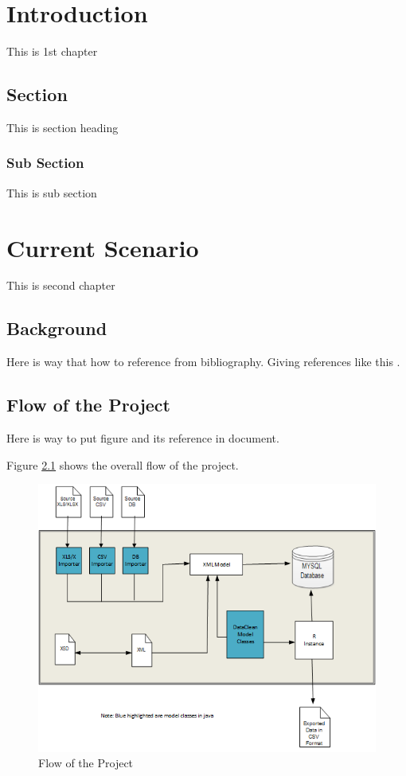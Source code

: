 \documentclass{report}
\begin{document}
\newpage
{}
\doublespacing
\large

\chapter{Introduction}
 This is 1st chapter
 
\section{Section}
This is section heading

\subsection{Sub Section}
This is sub section


\newpage	
\chapter{Current Scenario}
This is second chapter

\section{Background}
Here is way that how to reference from bibliography.
Giving references like this \cite{ch21}.


\section{Flow of the Project}

Here is way to put figure and its reference in document. 


Figure \ref{flow} shows the overall flow of the project.

\begin{figure}[h!]
\centering
\includegraphics[width=1.0\textwidth]{Figures/flow}
\caption{Flow of the Project}
\label{flow}
\end{figure}
\end{document}
